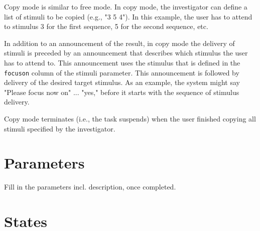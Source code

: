 \documentclass[letterpaper,oneside,12pt]{article}
\begin{document}
Copy mode is similar to free mode. In copy mode, the investigator can define a 
list of stimuli to be copied (e.g., "3 5 4"). In this example, the user has to 
attend to stimulus 3 for the first sequence, 5 for the second sequence, etc.

In addition to an announcement of the result, in copy mode the delivery of 
stimuli is preceded by an announcement that describes which stimulus the user
has to attend to. This announcement uses the stimulus that is defined in the
\texttt{focuson} column of the stimuli parameter. This announcement is followed by
delivery of the desired target stimulus. As an example, the system might say
"Please focus now on" ... "yes," before it starts with the sequence of
stimulus delivery.

Copy mode terminates (i.e., the task suspends) when the user finished copying 
all stimuli specified by the investigator.

\section{Parameters}

Fill in the parameters incl. description, once completed.


\section{States}
\end{document}
